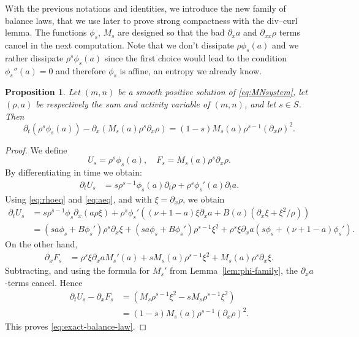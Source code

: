 \documentclass[a4paper,twosided,11pt]{article}
\newcommand{\p}{\partial}
\newcommand{\1}{\mathbf{1}}
\theoremstyle{plain}
\newtheorem{proposition}[thm]{Proposition}
\theoremstyle{remark}
\numberwithin{equation}{section}
\begin{document}
With the previous notations and identities, we introduce the new family of balance laws, that we use later to prove strong compactness with the div--curl lemma. The functions $\phi_s$, $M_s$ are designed so that the bad $\partial_x a$ and $\partial_{xx}\rho$ terms cancel in the next computation. Note that we don't dissipate $\rho\phi_s(a)$ and we rather dissipate $\rho^s\phi_s(a)$ since the first choice would lead to the condition $\phi_s''(a)=0$ and therefore $\phi_s$ is affine, an entropy we already know.

\begin{proposition}
\label{prop:entropy-identity}
Let $(m,n)$ be a smooth positive solution of \eqref{eq:MNsystem}, let $(\rho,a)$ be respectively the sum and activity variable of $(m,n)$, and let $s\in S$. Then
\begin{equation}
\label{eq:exact-balance-law}
 \p_t\left(\rho^s\phi_s(a)\right)
 - \p_x\left(M_s(a)\rho^s \partial_x\rho\right)
 =(1-s)M_s(a)\rho^{s-1} (\partial_x\rho)^2.
\end{equation}
\end{proposition}



\begin{proof}
We define
$$
U_s=\rho^s\phi_s(a),
\quad
F_s=M_s(a)\rho^s \partial_x\rho.
$$
By differentiating in time we obtain:
\begin{align*}
\p_t U_s
&= s\rho^{s-1}\phi_s(a)\partial_t \rho+\rho^s\phi_s'(a)\partial_t a.
\end{align*}
Using \eqref{eq:rhoeq} and \eqref{eq:aeq}, and with $\xi= \partial_x\rho$, we obtain
\begin{align*}
\p_t U_s
&= s\rho^{s-1}\phi_s \p_x(a\rho\xi)
 +\rho^s\phi_s'\left((\nu+1-a)\xi  \partial_x a + B(a)\left(\partial_x\xi+\xi^2/\rho\right)\right)\\
&=\left(sa\phi_s+B\phi_s'\right)\rho^s\partial_x\xi
 +\left(sa\phi_s+B\phi_s'\right)\rho^{s-1}\xi^2
 +\rho^s\xi  \partial_x a\left(s\phi_s+(\nu+1-a)\phi_s'\right).
\end{align*}
On the other hand,
\begin{align*}
\p_x F_s
&=\rho^s\xi  \partial_x a M_s'(a)+sM_s(a)\rho^{s-1}\xi^2+M_s(a)\rho^s\partial_x\xi.
\end{align*}
Subtracting, and using the formula for $M_s'$ from Lemma~\ref{lem:phi-family}, the $ \partial_x a$-terms cancel. Hence
\begin{align*}
\p_t U_s-\p_x F_s
&=\left(M_s\rho^{s-1}\xi^2-sM_s\rho^{s-1}\xi^2\right)\\
&=(1-s)M_s(a)\rho^{s-1} (\partial_x\rho)^2.
\end{align*}
This proves \eqref{eq:exact-balance-law}.
\end{proof}
\end{document}
